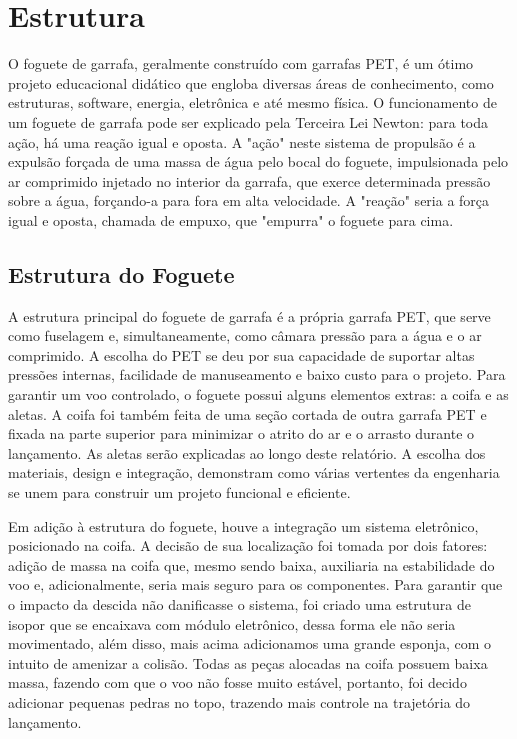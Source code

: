 \section{Estrutura}

O foguete de garrafa, geralmente construído com garrafas PET, é um ótimo projeto educacional didático que engloba diversas áreas de conhecimento, como estruturas, software, energia, eletrônica e até mesmo física. O funcionamento de um foguete de garrafa pode ser explicado pela Terceira Lei Newton: para toda ação, há uma reação igual e oposta. A "ação" neste sistema de propulsão é a expulsão forçada de uma massa de água pelo bocal do foguete, impulsionada pelo ar comprimido injetado no interior da garrafa, que exerce determinada pressão sobre a água, forçando-a para fora em alta velocidade. A "reação" seria a força igual e oposta, chamada de empuxo, que "empurra" o foguete para cima.

\subsection{Estrutura do Foguete}

A estrutura principal do foguete de garrafa é a própria garrafa PET, que serve como fuselagem e, simultaneamente, como câmara pressão para a água e o ar comprimido. A escolha do PET se deu por sua capacidade de suportar altas pressões internas, facilidade de manuseamento e baixo custo para o projeto. Para garantir um voo controlado, o foguete possui alguns elementos extras: a coifa e as aletas. A coifa foi também feita de uma seção cortada de outra garrafa PET e fixada na parte superior para minimizar o atrito do ar e o arrasto durante o lançamento. As aletas serão explicadas ao longo deste relatório. A escolha dos materiais, design e integração, demonstram como várias vertentes da engenharia se unem para construir um projeto funcional e eficiente.

Em adição à estrutura do foguete, houve a integração um sistema eletrônico, posicionado na coifa. A decisão de sua localização foi tomada por dois fatores: adição de massa na coifa que, mesmo sendo baixa, auxiliaria na estabilidade do voo e, adicionalmente, seria mais seguro para os componentes. Para garantir que o impacto da descida não danificasse o sistema, foi criado uma estrutura de isopor que se encaixava com módulo eletrônico, dessa forma ele não seria movimentado, além disso, mais acima adicionamos uma grande esponja, com o intuito de amenizar a colisão. Todas as peças alocadas na coifa possuem baixa massa, fazendo com que o voo não fosse muito estável, portanto, foi decido adicionar pequenas pedras no topo, trazendo mais controle na trajetória do lançamento. 

